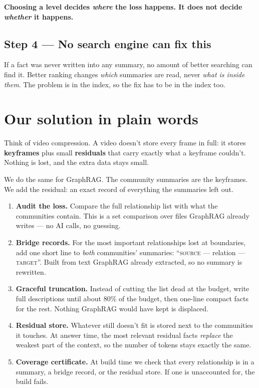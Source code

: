 \documentclass[11pt]{article}
\begin{document}
\begin{keybox}
\textbf{Choosing a level decides \emph{where} the loss happens. It does not decide \emph{whether} it happens.}
\end{keybox}

\subsection{Step 4 --- No search engine can fix this}
If a fact was never written into any summary, no amount of better searching can find it. Better ranking changes \emph{which} summaries are read, never \emph{what is inside them}. The problem is in the index, so the fix has to be in the index too.

\section{Our solution in plain words}

Think of video compression. A video doesn't store every frame in full: it stores \textbf{keyframes} plus small \textbf{residuals} that carry exactly what a keyframe couldn't. Nothing is lost, and the extra data stays small.

We do the same for GraphRAG. The community summaries are the keyframes. We add the residual: an exact record of everything the summaries left out.

\begin{enumerate}
  \item \textbf{Audit the loss.} Compare the full relationship list with what the communities contain. This is a set comparison over files GraphRAG already writes --- no AI calls, no guessing.
  \item \textbf{Bridge records.} For the most important relationships lost at boundaries, add one short line to \emph{both} communities' summaries: ``\textsc{source} --- relation --- \textsc{target}''. Built from text GraphRAG already extracted, so no summary is rewritten.
  \item \textbf{Graceful truncation.} Instead of cutting the list dead at the budget, write full descriptions until about 80\% of the budget, then one-line compact facts for the rest. Nothing GraphRAG would have kept is displaced.
  \item \textbf{Residual store.} Whatever still doesn't fit is stored next to the communities it touches. At answer time, the most relevant residual facts \emph{replace} the weakest part of the context, so the number of tokens stays exactly the same.
  \item \textbf{Coverage certificate.} At build time we check that every relationship is in a summary, a bridge record, or the residual store. If one is unaccounted for, the build fails.
\end{enumerate}
\end{document}
